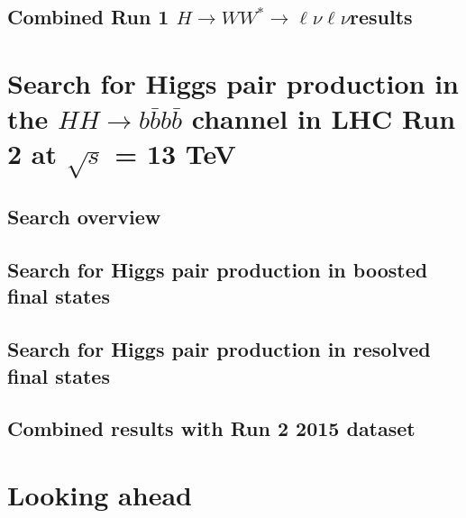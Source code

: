 \documentclass{Dissertate}
\begin{document}
\chapter{Combined Run 1 $H\rightarrow WW^{*}\rightarrow \ell\nu\ell\nu$results}

\part{Search for Higgs pair production in the $HH\rightarrow
  b\bar{b}b\bar{b}$ channel in LHC Run 2 at $\sqrt{s}$ = 13 TeV}

\chapter{Search overview}

\chapter{Search for Higgs pair production in boosted final states}

\chapter{Search for Higgs pair production in resolved final states}

\chapter{Combined results with Run 2 2015 dataset}

\part{Looking ahead}

%    


\clearpage




\end{document}
